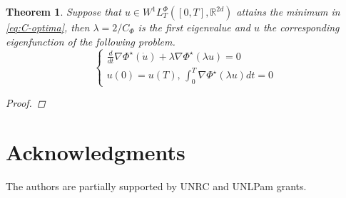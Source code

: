 \documentclass[twoside]{article}
\newtheorem{thm}{Theorem}[section]
\theoremstyle{remark}
\newcommand{\lphi}{L^{\Phi}}
\newcommand{\wphit}{W^{1}\lphi_T}
\newcommand{\rr}{\mathbb{R}}
\renewcommand{\geq}{\geqslant}
\newcommand{\Phie}{\Phi^{\star}}
\begin{document}
\begin{thm}\label{thm:C-opt-hamil} Suppose that $u\in \wphit([0,T],\rr^{2d})$ attains the minimum in \eqref{eq:C-optima}, then $\lambda=2/C_{\Phi}$ is the first eigenvalue and $u$ the corresponding eigenfunction of the following problem.
\begin{equation}\label{eq:eigen_prob}
\left\{
\begin{array}{l}
 \frac{d}{dt}\nabla\Phie(\dot{u})+\lambda\nabla\Phie(\lambda u)=0\\
 u(0)=u(T), \, \int_0^T\nabla\Phie (\lambda u)dt=0
\end{array}
\right.\tag{Eig}
\end{equation}
\begin{proof} 
 
\end{proof}






 
\end{thm}


















%


\section*{Acknowledgments}
The authors are partially supported by  UNRC and UNLPam grants. 

% 
 
 

\end{document}
